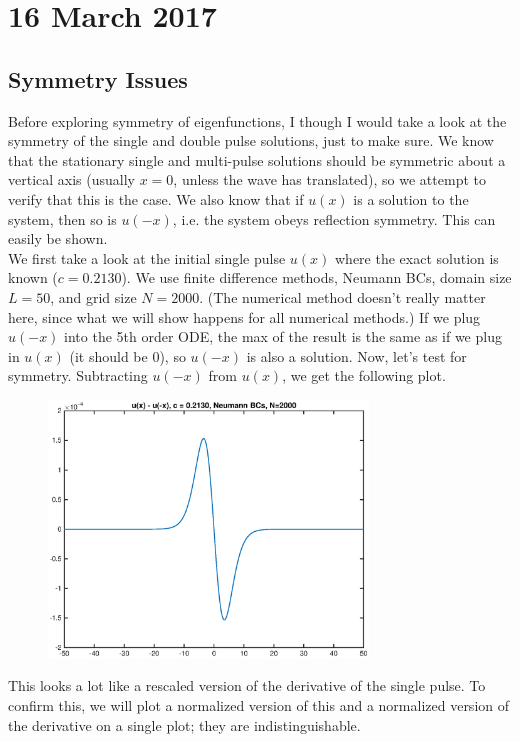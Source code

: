 \documentclass[12pt]{article}
\begin{document}
\section*{16 March 2017}

\subsection*{Symmetry Issues}
Before exploring symmetry of eigenfunctions, I though I would take a look at the symmetry of the single and double pulse solutions, just to make sure. We know that the stationary single and multi-pulse solutions should be symmetric about a vertical axis (usually $x = 0$, unless the wave has translated), so we attempt to verify that this is the case. We also know that if $u(x)$ is a solution to the system, then so is $u(-x)$, i.e. the system obeys reflection symmetry. This can easily be shown.\\

We first take a look at the initial single pulse $u(x)$ where the exact solution is known ($c = 0.2130$). We use finite difference methods, Neumann BCs, domain size $L = 50$, and grid size $N = 2000$. (The numerical method doesn't really matter here, since what we will show happens for all numerical methods.) If we plug $u(-x)$ into the 5th order ODE, the max of the result is the same as if we plug in $u(x)$ (it should be 0), so $u(-x)$ is also a solution. Now, let's test for symmetry. Subtracting $u(-x)$ from $u(x)$, we get the following plot.

\begin{figure}[H]
\includegraphics[width=8.5cm]{0singleflipdiffneumann}
\end{figure}

This looks a lot like a rescaled version of the derivative of the single pulse. To confirm this, we will plot a normalized version of this and a normalized version of the derivative on a single plot; they are indistinguishable.
\end{document}
